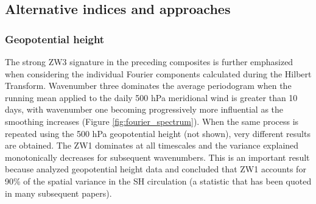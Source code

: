 \subsection{Alternative indices and approaches}

\subsubsection{Geopotential height}\label{s:geopotential_height}

The strong ZW3 signature in the preceding composites is further emphasized when considering the individual Fourier components calculated during the Hilbert Transform. Wavenumber three dominates the average periodogram when the running mean applied to the daily 500 hPa meridional wind is greater than 10 days, with wavenumber one becoming progressively more influential as the smoothing increases (Figure \ref{fig:fourier_spectrum}). When the same process is repeated using the 500 hPa geopotential height (not shown), very different results are obtained. The ZW1 dominates at all timescales and the variance explained monotonically decreases for subsequent wavenumbers. This is an important result because \citet{vanLoon1972} analyzed geopotential height data and concluded that ZW1 accounts for 90\% of the spatial variance in the SH circulation (a statistic that has been quoted in many subsequent papers). 